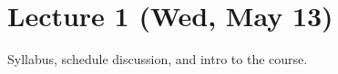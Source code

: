 \documentclass[../../master-handout.tex]{subfiles}
\begin{document}
\section{Lecture 1 (Wed, May 13)}

Syllabus, schedule discussion, and intro to the course.
\end{document}
